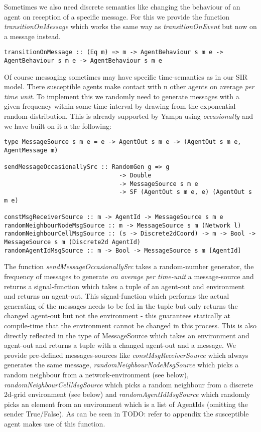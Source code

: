 Sometimes we also need discrete semantics like changing the behaviour of an agent on reception of a specific message. For this we provide the function \textit{transitionOnMessage} which works the same way as \textit{transitionOnEvent} but now on a message instead.

\begin{verbatim}
transitionOnMessage :: (Eq m) => m -> AgentBehaviour s m e -> AgentBehaviour s m e -> AgentBehaviour s m e
\end{verbatim}

Of course messaging sometimes may have specific time-semantics as in our SIR model. There susceptible agents make contact with n other agents on average \textit{per time unit}. To implement this we randomly need to generate messages with a given frequency within some time-interval by drawing from the exponential random-distribution. This is already supported by Yampa using \textit{occasionally} and we have built on it a the following:

\begin{verbatim}
type MessageSource s m e = e -> AgentOut s m e -> (AgentOut s m e, AgentMessage m)

sendMessageOccasionallySrc :: RandomGen g => g 
                                -> Double
                                -> MessageSource s m e 
                                -> SF (AgentOut s m e, e) (AgentOut s m e)

constMsgReceiverSource :: m -> AgentId -> MessageSource s m e
randomNeighbourNodeMsgSource :: m -> MessageSource s m (Network l)
randomNeighbourCellMsgSource :: (s -> Discrete2dCoord) -> m -> Bool -> MessageSource s m (Discrete2d AgentId)
randomAgentIdMsgSource :: m -> Bool -> MessageSource s m [AgentId]
\end{verbatim}

The function \textit{sendMessageOccasionallySrc} takes a random-number generator, the frequency of messages to generate \textit{on average per time-unit} a message-source and returns a signal-function which takes a tuple of an agent-out and environment and returns an agent-out. This signal-function which performs the actual generating of the messages needs to be fed in the tuple but only returns the changed agent-out but not the environment - this guarantees statically at compile-time that the environment cannot be changed in this process. This is also directly reflected in the type of MessageSource which takes an environment and agent-out and returns a tuple with a changed agent-out and a message. We provide pre-defined messages-sources like \textit{constMsgReceiverSource} which always generates the same message, \textit{randomNeighbourNodeMsgSource} which picks a random neighbour from a network-environment (see below), \textit{randomNeighbourCellMsgSource} which picks a random neighbour from a discrete 2d-grid environment (see below) and \textit{randomAgentIdMsgSource} which randomly picks an element from an environment which is a list of AgentIds (omitting the sender True/False).
As can be seen in TODO: refer to appendix the susceptible agent makes use of this function.

